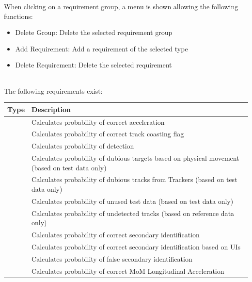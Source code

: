 When clicking on a requirement group, a menu is shown allowing the following functions:
\begin{itemize}  
\item Delete Group: Delete the selected requirement group
\item Add Requirement: Add a requirement of the selected type
\item Delete Requirement: Delete the selected requirement
\end{itemize}
\ \\

The following requirements exist:

\begin{center}
 \begin{table}[H]
  \begin{tabularx}{\textwidth}{ | l | X |  }
    \hline
    \textbf{Type} & \textbf{Description} \\ \hline
    \nameref{sec:eval_req_accel_correct} & Calculates probability of correct acceleration \\ \hline
    \nameref{sec:eval_req_trk_coast_correct} & Calculates probability of correct track coasting flag \\ \hline
    \nameref{sec:eval_req_detection} & Calculates probability of detection  \\ \hline
    \nameref{sec:eval_req_dubious_targets} & Calculates probability of dubious targets based on physical movement (based on test data only) \\ \hline
    \nameref{sec:eval_req_dubious_tracks} & Calculates probability of dubious tracks from Trackers (based on test data only) \\ \hline
    \nameref{sec:eval_req_extra_data} & Calculates probability of unused test data (based on test data only) \\ \hline
    \nameref{sec:eval_req_extra_track} & Calculates probability of undetected tracks (based on reference data only) \\ \hline
    \nameref{sec:eval_req_id_correct} & Calculates probability of correct secondary identification \\ \hline
    \nameref{sec:eval_req_id_correct_periods} & Calculates probability of correct secondary identification based on UIs \\ \hline
    \nameref{sec:eval_req_id_false} & Calculates probability of false secondary identification \\ \hline
    \nameref{sec:eval_req_mom_long} & Calculates probability of correct MoM Longitudinal Acceleration \\ \hline

\end{tabularx}
\end{table}
\end{center}
